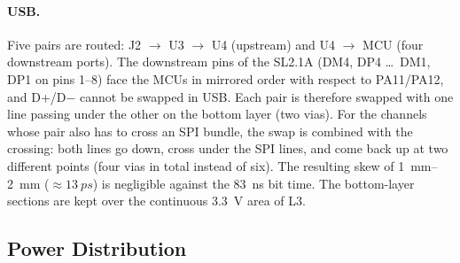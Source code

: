 \documentclass[11pt,a4paper]{article}
\begin{document}
\paragraph{USB.} Five pairs are routed: J2 $\to$ U3 $\to$ U4 (upstream) and U4 $\to$ MCU (four downstream
ports). The downstream pins of the SL2.1A (DM4, DP4 \dots\ DM1, DP1 on pins 1--8) face the
MCUs in mirrored order with respect to PA11/PA12, and D+/D$-$ cannot be swapped in USB.
Each pair is therefore swapped with one line passing under the other on the bottom layer (two
vias). For the channels whose pair also has to cross an SPI bundle, the swap is combined with the
crossing: both lines go down, cross under the SPI lines, and come back up at two different points
(four vias in total instead of six). The resulting skew of \qtyrange{1}{2}{mm} ($\approx\qty{13}{ps}$) is negligible
against the \qty{83}{ns} bit time. The bottom-layer sections are kept over the continuous \qty{3.3}{V} area of
L3.

\subsection{Power Distribution}
\end{document}
